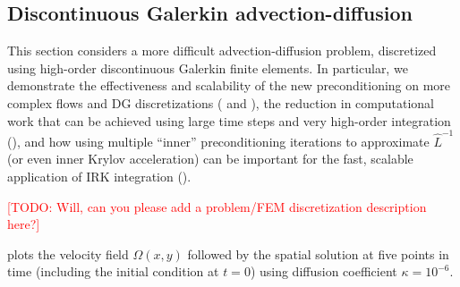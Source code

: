 \documentclass[review]{siamart}
\makeatletter
\newcommand{\todo}[1]{\textcolor{red}{[TODO\@: #1]}}
\makeatother
\begin{document}
\subsection{Discontinuous Galerkin advection-diffusion}\label{sec:numerics_lin:dg}

This section considers a more difficult advection-diffusion problem, discretized
using high-order discontinuous Galerkin finite elements. In particular, we demonstrate
the effectiveness and scalability of the new preconditioning on more complex flows and 
DG discretizations ( and ),
the reduction in computational work that can be achieved using large time steps and
very high-order integration (), and how
using multiple ``inner'' preconditioning iterations to approximate $\widehat{L}^{-1}$
(or even inner Krylov acceleration) can be important for the fast, scalable
application of IRK integration ().


\todo{Will, can you please add a problem/FEM discretization description here?}


 plots the velocity field $\Omega(x,y)$ followed by the spatial
solution at five points in time (including the initial condition at $t=0$) using
diffusion coefficient $\kappa = 10^{-6}$.
\end{document}
